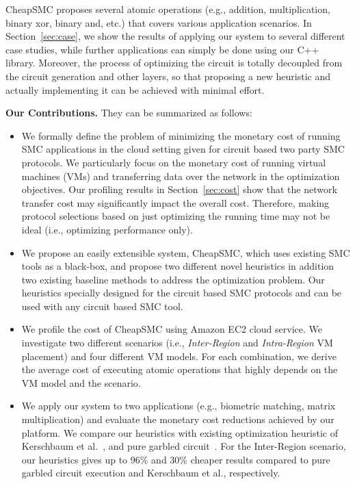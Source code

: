 \documentclass{llncs}
\newcommand{\sysname}{{CheapSMC}\xspace}
\begin{document}
\sysname proposes several atomic operations (e.g., addition, multiplication, binary xor, binary and, etc.) that covers various application scenarios. In Section~\ref{sec:case}, we show the results of applying our system to several different case studies, while further applications can simply be done using our C++ library. Moreover, the process of optimizing the circuit is totally decoupled from the circuit generation and other layers, so that proposing a new heuristic and actually implementing it can be achieved with minimal effort.

\textbf{Our Contributions.} They can be summarized as follows:
\begin{itemize}
	\item We formally define the problem of minimizing the monetary cost of running SMC applications in the cloud setting given for circuit based two party SMC protocols. We particularly focus on the monetary cost of running virtual machines (VMs) and transferring data over the network in the optimization objectives. Our profiling results in Section~\ref{sec:cost} show that the network transfer cost may significantly impact the overall cost. Therefore, making protocol selections based on just optimizing the running time may not be ideal (i.e., optimizing performance only).
	\item We propose an easily extensible system, \sysname, which uses existing SMC tools as a black-box, and propose two different novel heuristics in addition two existing baseline methods to address the optimization problem. Our heuristics specially designed for the circuit based SMC protocols and can be used with any circuit based SMC tool.
	\item We profile the cost of \sysname using Amazon EC2 cloud service. We investigate two different scenarios (i.e., \emph{Inter-Region} and \emph{Intra-Region} VM placement) and four different VM models. For each combination, we derive the average cost of executing atomic operations that highly depends on the VM model and the scenario.
	\item We apply our system to two applications (e.g., biometric matching, matrix multiplication) and evaluate the monetary cost reductions achieved by our platform. We compare our heuristics with existing optimization heuristic of Kerschbaum et al.~\cite{cite:kerschbaum2014automatic}, and pure garbled circuit~\cite{cite:yao1982protocols}. For the Inter-Region scenario, our heuristics gives up to $96\%$ and $30\%$ cheaper results compared to pure garbled circuit execution and Kerschbaum et al., respectively. 
\end{itemize}
\end{document}
